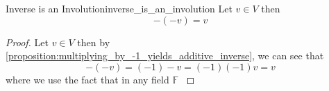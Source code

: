 \begin{proposition}{Inverse is an Involution}{inverse_is_an_involution}
Let \( v \in  V \) then
\[
- \left( - v \right) = v
\]
\end{proposition}
\begin{proof}
    Let \( v \in  V \) then by
    \ref{proposition:multiplying_by_-1_yields_additive_inverse}, we can see that 
    \[
    - \left( - v \right) =  \left( -1 \right) - v = \left( -1 \right) \left( - 1
    \right) v =  v
    \]
    where we use the fact that in any field \( \mathbb{F} \) \(  \) 
\end{proof}
